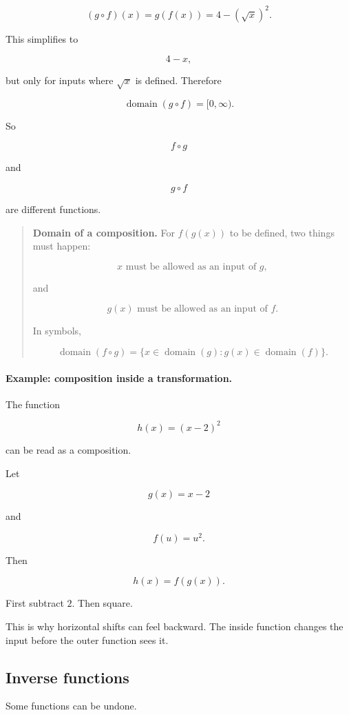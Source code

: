 \[
(g\circ f)(x)=g(f(x))=4-(\sqrt{x})^2.
\]

This simplifies to

\[
4-x,
\]

but only for inputs where \(\sqrt{x}\) is defined. Therefore

\[
\operatorname{domain}(g\circ f)=[0,\infty).
\]

So

\[
f\circ g
\]

and

\[
g\circ f
\]

are different functions.

\begin{quote}
\textbf{Domain of a composition.}
For \(f(g(x))\) to be defined, two things must happen:

\[
x \text{ must be allowed as an input of } g,
\]

and

\[
g(x) \text{ must be allowed as an input of } f.
\]

In symbols,

\[
\operatorname{domain}(f\circ g)
=
\{x\in \operatorname{domain}(g): g(x)\in \operatorname{domain}(f)\}.
\]
\end{quote}

\paragraph{Example: composition inside a transformation.}
The function

\[
h(x)=(x-2)^2
\]

can be read as a composition.

Let

\[
g(x)=x-2
\]

and

\[
f(u)=u^2.
\]

Then

\[
h(x)=f(g(x)).
\]

First subtract \(2\). Then square.

This is why horizontal shifts can feel backward. The inside function changes the input before the outer function sees it.

\subsection{Inverse functions}
\label{subsec:inverse-functions}

Some functions can be undone.

